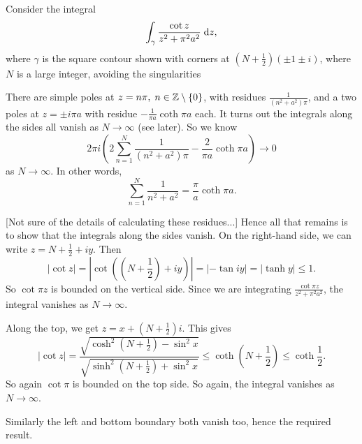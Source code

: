 \documentclass[a4paper]{article}
\begin{document}
Consider the integral
\[
\int_\gamma \frac{\cot z}{z^2 + \pi^{2} a^{2}}\;\mathrm{d} z,
\]
where $\gamma$ is the square contour shown with corners at $(N + \frac{1}{2})(\pm 1 \pm i)$, where $N$ is a large integer, avoiding the singularities
\begin{center}
\end{center}
There are simple poles at $z = n \pi, \; n \in \mathbb{Z}\setminus \{0\}$, with residues $\frac{1}{(n^2 + a^{2}) \pi}$, and a two poles at $z = \pm i \pi a$ with residue $-\frac{1}{\pi a} \coth \pi a$ each. It turns out the integrals along the sides all vanish as $N \to \infty$ (see later). So we know
\[
2\pi i\left(2 \sum_{n = 1}^N \frac{1}{(n^2 + a^{2}) \pi} - \frac{2}{\pi a}  \coth \pi a \right) \to 0
\]
as $N \to \infty$. In other words,
\[
\sum_{n = 1}^N \frac{1}{n^2 + a^{2}} = \frac{\pi}{a} \coth \pi a.
\]

[Not sure of the details of calculating these residues...]
Hence all that remains is to show that the integrals along the sides vanish. On the right-hand side, we can write $z = N + \frac{1}{2} + iy$. Then
\[
|\cot z| = \left|\cot\left( \left(N + \frac{1}{2}\right) + i y\right)\right| = |-\tan i y| = |\tanh y| \leq 1.
\]
So $\cot \pi z$ is bounded on the vertical side. Since we are integrating $\frac{\cot \pi z}{z^2 + \pi^{2} a^{2}}$, the integral vanishes as $N \to \infty$.

Along the top, we get $z = x + \left(N + \frac{1}{2}\right)i$. This gives
\[
|\cot z| = \frac{\sqrt{\cosh^2 \left(N + \frac{1}{2}\right) - \sin^2 x}}{\sqrt{\sinh^2 \left(N + \frac{1}{2}\right) + \sin^2 x}} \leq \coth\left(N + \frac{1}{2}\right) \leq \coth \frac{1}{2}.
\]
So again $\cot \pi $ is bounded on the top side. So again, the integral vanishes as $N \to \infty$.

Similarly the left and bottom boundary both vanish too, hence the required result.
\end{document}
